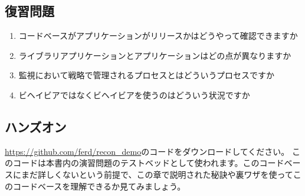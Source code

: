 \subsection*{復習問題}

\begin{enumerate}
  \item コードベースがアプリケーションがリリースかはどうやって確認できますか
  \item ライブラリアプリケーションとアプリケーションはどの点が異なりますか  
  \item 監視において戦略で管理されるプロセスとはどういうプロセスですか
  \item {}ビヘイビアではなくビヘイビアを使うのはどういう状況ですか
\end{enumerate}

\subsection*{ハンズオン}

\href{https://github.com/ferd/recon\_demo}{https://github.com/ferd/recon\_demo}のコードをダウンロードしてください。
このコードは本書内の演習問題のテストベッドとして使われます。このコードベースにまだ詳しくないという前提で、この章で説明された秘訣や裏ワザを使ってこのコードベースを理解できるか見てみましょう。


